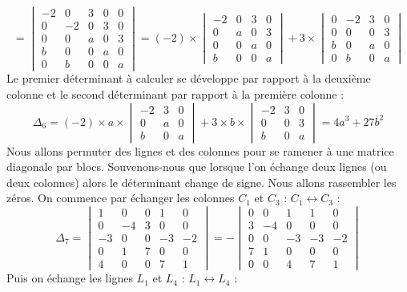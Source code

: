 {{$$=
\begin{vmatrix}
-2&0&3&0&0 \\ 0&-2&0&3&0 \\ 0&0&a&0&3 \\ b&0&0&a&0 \\ 0&b&0&0&a  
\end{vmatrix}
= (-2) \times \begin{vmatrix}
-2&0&3&0 \\ 0&a&0&3 \\ 0&0&a&0 \\ b&0&0&a  
\end{vmatrix}
+ 3  \times \begin{vmatrix}
0&-2&3&0 \\ 0&0&0&3 \\ b&0&a&0 \\ 0&b&0&a  
\end{vmatrix}
$$
Le premier déterminant à calculer se développe par rapport à la deuxième colonne et le second déterminant
par rapport à la première colonne :
$$\Delta_6 = (-2)\times a \times 
\begin{vmatrix}
-2&3&0 \\  0&a&0 \\ b&0&a  
\end{vmatrix}
+ 3  \times b \times 
\begin{vmatrix}
-2&3&0 \\ 0&0&3 \\ b&0&a  
\end{vmatrix}=4a^3+27b^2$$
Nous allons permuter des lignes et des colonnes pour se ramener à une matrice diagonale par blocs.
Souvenons-nous que lorsque l'on échange deux lignes (ou deux colonnes) alors le déterminant change de signe.
Nous allons rassembler les zéros.
On commence par échanger les colonnes $C_1$ et $C_3$ : $C_1\leftrightarrow C_3$ :
$$\Delta_7=
\begin{vmatrix}
1&0&0&1&0 \\ 0&-4&3&0&0 \\ -3&0&0&-3&-2 \\ 0&1&7&0&0 \\ 4&0&0&7&1  
\end{vmatrix}=
- \begin{vmatrix}
0&0&1&1&0 \\ 3&-4&0&0&0 \\ 0&0&-3&-3&-2 \\ 7&1&0&0&0 \\ 0&0&4&7&1  
\end{vmatrix}$$
Puis on échange les lignes $L_1$ et $L_4$ : $L_1\leftrightarrow L_4$ :
}}
